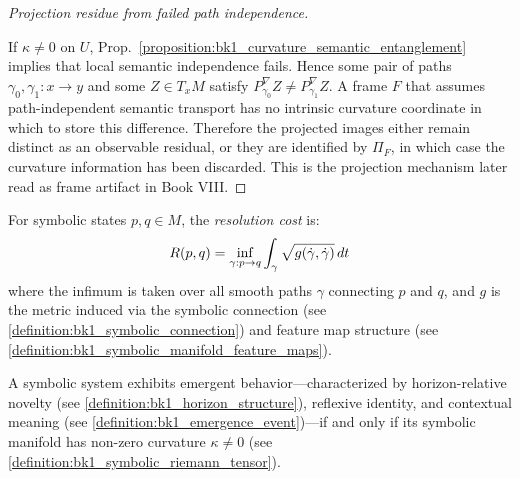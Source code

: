 \begin{proof}[Projection residue from failed path independence]
\label{proof:bk1_curvature_projection_residue}
\leavevmode

If $\kappa\neq 0$ on $U$, Prop.~\ref{proposition:bk1_curvature_semantic_entanglement}
implies that local semantic independence fails. Hence some pair of paths
$\gamma_0,\gamma_1:x\to y$ and some $Z\in T_xM$ satisfy
$P^\nabla_{\gamma_0}Z\neq P^\nabla_{\gamma_1}Z$. A frame $F$ that assumes
path-independent semantic transport has no intrinsic curvature coordinate in
which to store this difference. Therefore the projected images either remain
distinct as an observable residual, or they are identified by $\Pi_F$, in which
case the curvature information has been discarded. This is the projection
mechanism later read as frame artifact in Book VIII.
\end{proof}

\begin{definition}
\label{definition:bk1_resolution_cost}
For symbolic states $p, q \in M$, the \emph{resolution cost} is:
\[
R(p,q) = \inf_{\gamma: p \to q} \int_\gamma \sqrt{g(\dot{\gamma}, \dot{\gamma})} \, dt
\]
where the infimum is taken over all smooth paths $\gamma$ connecting $p$ and $q$, and $g$ is the metric induced via the symbolic connection (see \ref{definition:bk1_symbolic_connection}) and feature map structure (see \ref{definition:bk1_symbolic_manifold_feature_maps}).
\end{definition}

\begin{theorem}
\label{theorem:bk1_symbolic_emergence_and_curvature}
A symbolic system exhibits emergent behavior—characterized by horizon-relative novelty (see \ref{definition:bk1_horizon_structure}), reflexive identity, and contextual meaning (see \ref{definition:bk1_emergence_event})—if and only if its symbolic manifold has non-zero curvature $\kappa \neq 0$ (see \ref{definition:bk1_symbolic_riemann_tensor}).
\end{theorem}


